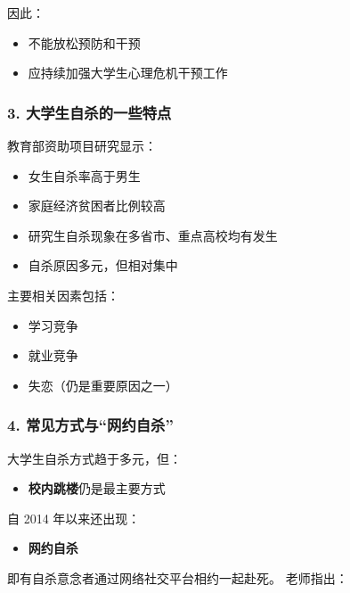 \documentclass[
  chinese,
  9pt,
  a4paper,
]{ctexart}
\providecommand{\tightlist}{%
  \setlength{\itemsep}{0pt}\setlength{\parskip}{0pt}}
\begin{document}
因此：

\begin{itemize}
\tightlist
\item
  不能放松预防和干预
\item
  应持续加强大学生心理危机干预工作
\end{itemize}

\subsubsection{3.
大学生自杀的一些特点}\label{ux5927ux5b66ux751fux81eaux6740ux7684ux4e00ux4e9bux7279ux70b9}

教育部资助项目研究显示：

\begin{itemize}
\tightlist
\item
  女生自杀率高于男生
\item
  家庭经济贫困者比例较高
\item
  研究生自杀现象在多省市、重点高校均有发生
\item
  自杀原因多元，但相对集中
\end{itemize}

主要相关因素包括：

\begin{itemize}
\tightlist
\item
  学习竞争
\item
  就业竞争
\item
  失恋（仍是重要原因之一）
\end{itemize}

\subsubsection{4.
常见方式与``网约自杀''}\label{ux5e38ux89c1ux65b9ux5f0fux4e0eux7f51ux7ea6ux81eaux6740}

大学生自杀方式趋于多元，但：

\begin{itemize}
\tightlist
\item
  \textbf{校内跳楼}仍是最主要方式
\end{itemize}

自 2014 年以来还出现：

\begin{itemize}
\tightlist
\item
  \textbf{网约自杀}
\end{itemize}

即有自杀意念者通过网络社交平台相约一起赴死。 老师指出：
\end{document}
